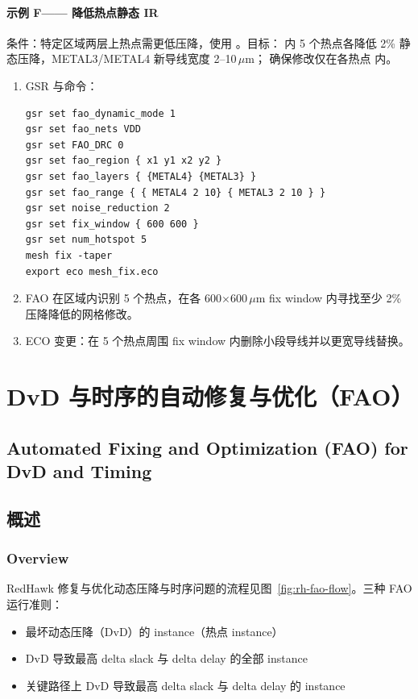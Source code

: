 \paragraph{示例 F—— 降低热点静态 IR}
条件：特定区域两层上热点需更低压降，使用 。目标： 内 5 个热点各降低 2\% 静态压降，METAL3/METAL4 新导线宽度 2--10\,$\mu$m； 确保修改仅在各热点  内。
\begin{enumerate}
  \item GSR 与命令：
\begin{lstlisting}
gsr set fao_dynamic_mode 1
gsr set fao_nets VDD
gsr set FAO_DRC 0
gsr set fao_region { x1 y1 x2 y2 }
gsr set fao_layers { {METAL4} {METAL3} }
gsr set fao_range { { METAL4 2 10} { METAL3 2 10 } }
gsr set noise_reduction 2
gsr set fix_window { 600 600 }
gsr set num_hotspot 5
mesh fix -taper
export eco mesh_fix.eco
\end{lstlisting}
  \item FAO 在区域内识别 5 个热点，在各 600$\times$600\,$\mu$m fix window 内寻找至少 2\% 压降降低的网格修改。
  \item ECO 变更：在 5 个热点周围 fix window 内删除小段导线并以更宽导线替换。
\end{enumerate}

\section{DvD 与时序的自动修复与优化（FAO）}
\subsection*{Automated Fixing and Optimization (FAO) for DvD and Timing}

\subsection{概述}
\subsubsection*{Overview}

RedHawk 修复与优化动态压降与时序问题的流程见图~\ref{fig:rh-fao-flow}。三种 FAO 运行准则：
\begin{itemize}
  \item 最坏动态压降（DvD）的 instance（热点 instance）
  \item DvD 导致最高 delta slack 与 delta delay 的全部 instance
  \item 关键路径上 DvD 导致最高 delta slack 与 delta delay 的 instance
\end{itemize}

